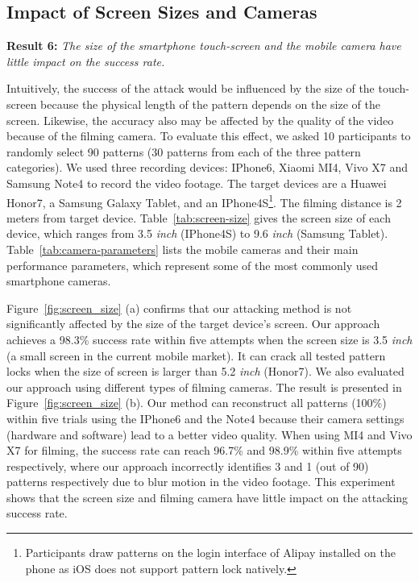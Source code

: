     \subsection{Impact of Screen Sizes and Cameras}
    \noindent \textbf{Result 6:} \emph{The size of the smartphone touch-screen and the mobile camera have little impact on the success rate.}

    Intuitively, the success of the attack would be influenced by the size of
    the touch-screen because the physical length of the pattern depends on
    the size of the screen. Likewise, the accuracy also may be affected by
    the quality of the video because of the filming camera. To evaluate this
    effect, we asked 10 participants to randomly select 90 patterns (30
    patterns from each of the three pattern categories). We used three
    recording devices: IPhone6, Xiaomi MI4, Vivo X7 and Samsung Note4 to
    record the video footage. The target devices are a Huawei Honor7, a
    Samsung Galaxy Tablet, and an IPhone4S\footnote{Participants draw
    patterns on the login interface of Alipay installed on the phone as iOS
    does not support pattern lock natively.}. The filming distance is 2
    meters from target device. Table~\ref{tab:screen-size} gives the screen
    size of each device, which ranges from 3.5 \emph{inch} (IPhone4S) to
    9.6 \emph{inch} (Samsung Tablet). Table~\ref{tab:camera-parameters} lists
    the mobile cameras and their main performance parameters, which
    represent some of the most commonly used smartphone cameras.

    Figure~\ref{fig:screen_size} (a) confirms that our attacking method
    is not significantly affected by the size of the
     target device's screen. Our approach achieves a 98.3\%  success rate within five
    attempts when the screen size is 3.5 \emph{inch} (a small screen in the current
     mobile market). It can crack all tested pattern locks when
    the size of screen is larger than 5.2 \emph{inch} (Honor7). We also
    evaluated  our approach using different types of filming cameras.
    The result is presented in Figure~\ref{fig:screen_size}
    (b). Our method can reconstruct all patterns (100\%) within five trials using
    the IPhone6 and the Note4 because their camera settings (hardware and software) lead to a better video
    quality.   When using MI4 and Vivo X7 for filming,
     the success rate can reach 96.7\% and 98.9\% within five
    attempts respectively, where our approach incorrectly identifies 3 and 1 (out of
    90) patterns respectively due to blur motion in the video footage.
    This experiment shows that the screen size and filming camera
    have little impact on the attacking success rate.


